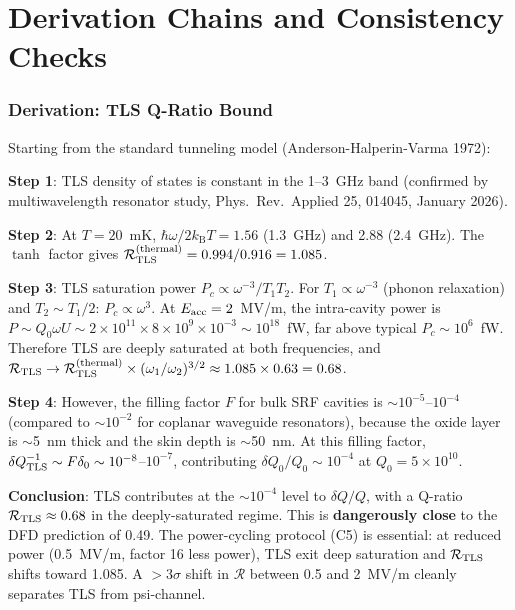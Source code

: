 \documentclass[11pt]{article}
\newcommand{\ee}[1]{\times 10^{#1}}
\newcommand{\kB}{k_{\mathrm{B}}}
\theoremstyle{definition}
\theoremstyle{remark}
\begin{document}
\part{Derivation Chains and Consistency Checks}
\label{part:derivations}


\section{Derivation: TLS Q-Ratio Bound}
\label{sec:tls_derivation}

Starting from the standard tunneling model (Anderson-Halperin-Varma 1972):

\textbf{Step 1}: TLS density of states is constant in the 1--3~GHz band
(confirmed by multiwavelength resonator study, Phys.\ Rev.\ Applied 25,
014045, January 2026).

\textbf{Step 2}: At $T = 20$~mK, $\hbar\omega/2\kB T = 1.56$ (1.3~GHz)
and 2.88 (2.4~GHz). The $\tanh$ factor gives
$\mathcal{R}_{\rm TLS}^{(\rm thermal)} = 0.994/0.916 = 1.085$.

\textbf{Step 3}: TLS saturation power $P_c \propto \omega^{-3}/T_1 T_2$.
For $T_1 \propto \omega^{-3}$ (phonon relaxation) and $T_2 \sim T_1/2$:
$P_c \propto \omega^3$. At $E_{\rm acc} = 2$~MV/m, the intra-cavity
power is $P \sim Q_0 \omega U \sim 2\ee{11} \times 8\ee{9} \times
10^{-3} \sim 10^{18}$~fW, far above typical $P_c \sim 10^6$~fW.
Therefore TLS are deeply saturated at both frequencies, and
$\mathcal{R}_{\rm TLS} \to \mathcal{R}_{\rm TLS}^{(\rm thermal)}
\times (\omega_1/\omega_2)^{3/2} \approx 1.085 \times 0.63 = 0.68$.

\textbf{Step 4}: However, the filling factor $F$ for bulk SRF cavities
is $\sim 10^{-5}$--$10^{-4}$ (compared to $\sim 10^{-2}$ for
coplanar waveguide resonators), because the oxide layer is
$\sim$5~nm thick and the skin depth is $\sim$50~nm. At this
filling factor, $\delta Q_{\rm TLS}^{-1} \sim F\delta_0 \sim
10^{-8}$--$10^{-7}$, contributing $\delta Q_0/Q_0 \sim 10^{-4}$
at $Q_0 = 5\ee{10}$.

\textbf{Conclusion}: TLS contributes at the $\sim 10^{-4}$ level
to $\delta Q/Q$, with a Q-ratio $\mathcal{R}_{\rm TLS} \approx 0.68$
in the deeply-saturated regime. This is \textbf{dangerously close}
to the DFD prediction of 0.49. The power-cycling protocol (C5)
is essential: at reduced power (0.5~MV/m, factor 16 less power),
TLS exit deep saturation and $\mathcal{R}_{\rm TLS}$ shifts toward
1.085. A $>$3$\sigma$ shift in $\mathcal{R}$ between 0.5 and 2~MV/m
cleanly separates TLS from psi-channel.
\end{document}
